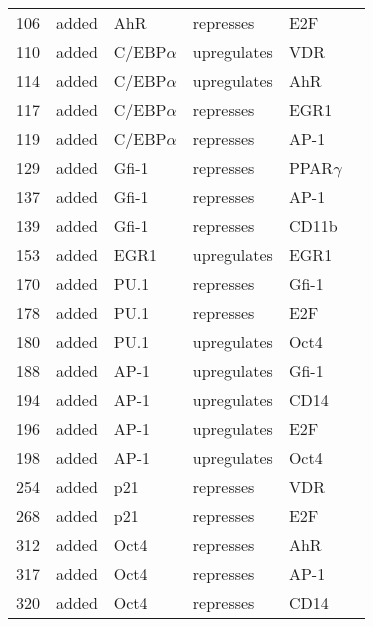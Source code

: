 \begin{center}
\begin{scriptsize}
\begin{supertabular}{|p{2 cm}|p{2cm}|p{3cm}|p{2.5cm}|p{2cm}|p{1.5cm}|}
106 &  added & AhR  & represses &  E2F & \cite{Marlowe2004}\\
110 &  added & C/EBP$\alpha$   & upregulates &  VDR & \\
114 &  added & C/EBP$\alpha$   & upregulates &  AhR & \\
117 &  added & C/EBP$\alpha$   & represses &  EGR1 & \cite{Hasemann2014}\\
119 &  added & C/EBP$\alpha$   & represses &  AP-1 & \\
129 &  added & Gfi-1  & represses &  PPAR$\gamma$ & \\
137 &  added & Gfi-1  & represses &  AP-1 & \\
139 &  added & Gfi-1  & represses &  CD11b & \\
153 &  added & EGR1  & upregulates &  EGR1 & \\
170 &  added & PU.1  & represses &  Gfi-1 & \cite{Laslo2006}\\
178 &  added & PU.1  & represses &  E2F & \\
180 &  added & PU.1  & upregulates &  Oct4 & \\
188 &  added & AP-1  & upregulates &  Gfi-1 & \\
194 &  added & AP-1  & upregulates &  CD14 & \\
196 &  added & AP-1  & upregulates &  E2F & \\
198 &  added & AP-1  & upregulates &  Oct4 & \\
254 &  added & p21  & represses &  VDR & \\
268 &  added & p21  & represses &  E2F & \\
312 &  added & Oct4  & represses &  AhR & \\
317 &  added & Oct4  & represses &  AP-1 & \\
320 &  added & Oct4  & represses &  CD14 & \\

\hline
\end{supertabular}
\end{scriptsize}
\end{center}
%






